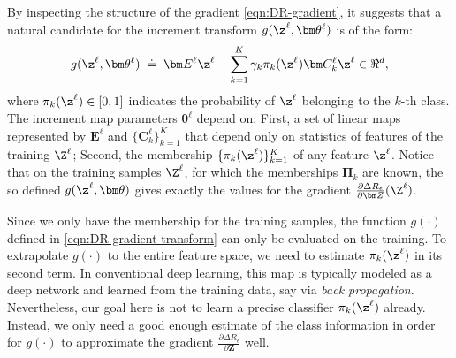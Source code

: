 \documentclass[../../book-main.tex]{subfiles}
\begin{document}
By inspecting the structure of the gradient \eqref{eqn:DR-gradient},
it suggests that a natural candidate for the increment transform
$g(\z^\ell, \bm \theta^\ell)$ is of the form:
\begin{equation}
    g(\z^\ell, \bm \theta^\ell) \; \doteq \; \bm E^\ell \z^\ell -
    \sum_{k=1}^K \gamma_{k} \pi_k(\z^\ell)\bm C_{k}^{\ell}  \z^{\ell}
    \in \Re^d,
    \label{eqn:DR-gradient-transform}
\end{equation}
where $\pi_k(\z^\ell) \in [0,1]$ indicates the probability of
$\z^{\ell}$ belonging to the $k$-th class. The increment map
parameters $\bm \theta^\ell$ depend on: First, a set of linear maps
represented by $\bm E^{\ell}$ and $\{ \bm C^{\ell}_{k}\}_{k=1}^{K}$
that depend only on statistics of features of the training $\Z^\ell$;
Second, the membership $\{ \pi_k(\z^\ell)\}_{k=1}^K$ of any feature $\z^\ell$.
Notice that on the training samples $\Z^\ell$, for which the
memberships $\bm \Pi_k$ are known,  the so defined $g(\z^\ell, \bm
\theta)$ gives exactly the values for the gradient $\frac{\partial
\Delta R_{\epsilon}}{\partial \bm Z}(\Z^\ell)$.

Since we only have the membership  for the training samples, the
function $g(\cdot)$ defined in \eqref{eqn:DR-gradient-transform} can
only be evaluated on the training. To extrapolate $g(\cdot)$ to the
entire feature space, we need to estimate $\pi_k(\z^\ell)$ in its
second term. In conventional deep learning, this map is typically
modeled as a deep network and learned from the training data, say via
{\em back propagation}. Nevertheless, our goal here is not to learn a
precise classifier $\pi_{k}(\z^\ell)$ already. Instead, we only need
a good enough estimate of the class information in order for
$g(\cdot)$ to approximate the gradient $\frac{\partial \Delta
R_{\epsilon}}{\partial \bm Z}$ well.
\end{document}
